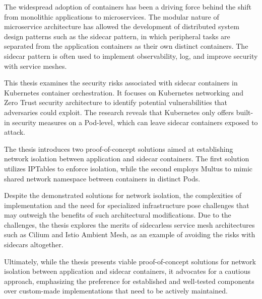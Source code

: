 \documentclass[english, 12pt, a4paper, sci, utf8, a-2b, online]{aaltothesis}
\date{29.12.2023}
\begin{document}
\makecoverpage
\makecopyrightpage

\clearpage



\begin{abstractpage}[english]
  The widespread adoption of containers has been a driving force behind the shift from monolithic applications to microservices.
  The modular nature of microservice architecture has allowed the development of distributed system design patterns such as the sidecar pattern, in which peripheral tasks are separated from the application containers as their own distinct containers.
  The sidecar pattern is often used to implement observability, log, and improve security with service meshes.

  This thesis examines the security risks associated with sidecar containers in Kubernetes container orchestration.
  It focuses on Kubernetes networking and Zero Trust security architecture to identify potential vulnerabilities that adversaries could exploit.
  The research reveals that Kubernetes only offers built-in security measures on a Pod-level, which can leave sidecar containers exposed to attack.

  The thesis introduces two proof-of-concept solutions aimed at establishing network isolation between application and sidecar containers.
  The first solution utilizes IPTables to enforce isolation, while the second employs Multus to mimic shared network namespace between containers in distinct Pods.

  Despite the demonstrated solutions for network isolation, the complexities of implementation and the need for specialized infrastructure pose challenges that may outweigh the benefits of such architectural modifications.
  Due to the challenges, the thesis explores the merits of sidecarless service mesh architectures such as Cilium and Istio Ambient Mesh, as an example of avoiding the risks with sidecars altogether.

  Ultimately, while the thesis presents viable proof-of-concept solutions for network isolation between application and sidecar containers, it advocates for a cautious approach, emphasizing the preference for established and well-tested components over custom-made implementations that need to be actively maintained.
\end{abstractpage}
\end{document}

